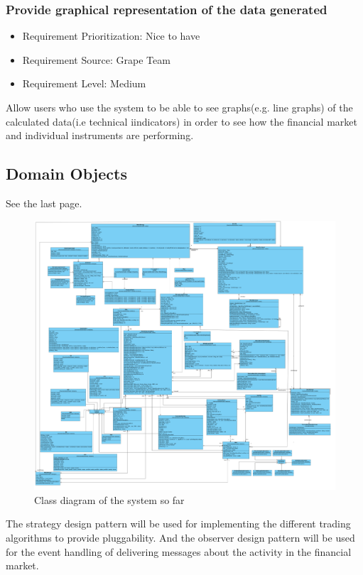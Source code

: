 \documentclass[12pt]{article}
\begin{document}
			\subsubsection{Provide graphical representation of the data generated}
			\begin{itemize}
				\item Requirement Prioritization: Nice to have
				\item Requirement Source: Grape Team 
				\item Requirement Level: Medium	
			\end{itemize}
			Allow users who use the system to be able to see graphs(e.g. line graphs) of the calculated data(i.e technical iindicators) in order to see how the financial market and individual instruments are performing.
					  
		\subsection{Domain Objects}	
		See the last page.	  
			\begin{figure}[th]
			\centering
			\includegraphics[scale=0.4]{./Paint_Image}
			\caption{Class diagram of the system so far}
			\label{domain objects}
			\end{figure}
								
			The strategy design pattern will be used for implementing the different trading algorithms to provide pluggability.
			And the observer design pattern will be used for the event handling of delivering messages about the activity in the financial market. 
			
\end{document}
